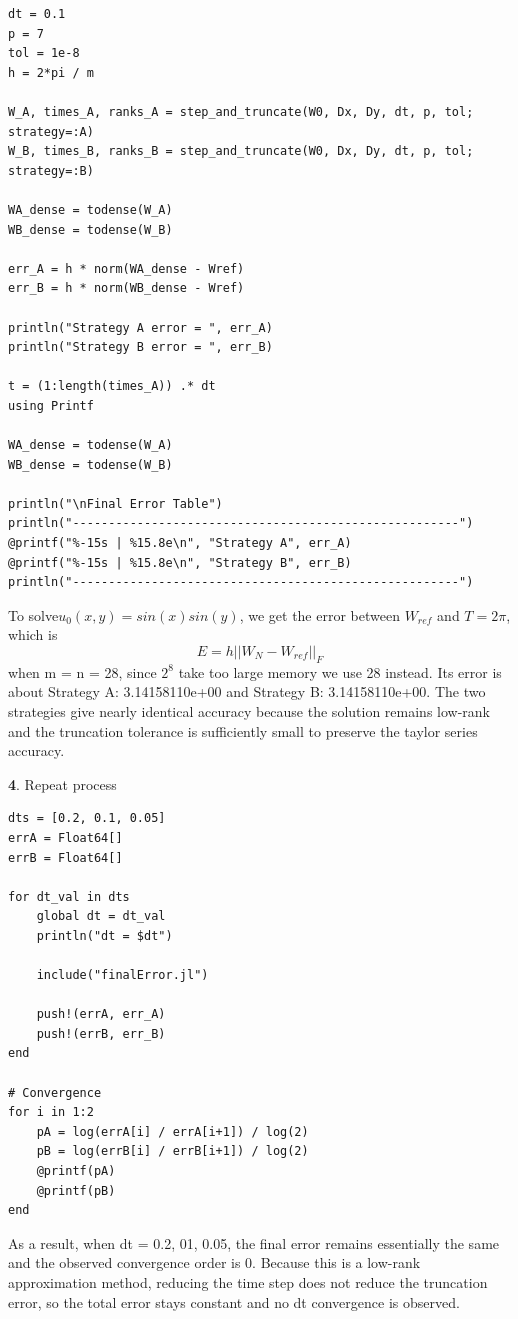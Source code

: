 \documentclass[11pt]{article}
\begin{document}
\begin{lstlisting}
dt = 0.1
p = 7
tol = 1e-8
h = 2*pi / m

W_A, times_A, ranks_A = step_and_truncate(W0, Dx, Dy, dt, p, tol; strategy=:A)
W_B, times_B, ranks_B = step_and_truncate(W0, Dx, Dy, dt, p, tol; strategy=:B)

WA_dense = todense(W_A)
WB_dense = todense(W_B)

err_A = h * norm(WA_dense - Wref)
err_B = h * norm(WB_dense - Wref)

println("Strategy A error = ", err_A)
println("Strategy B error = ", err_B)

t = (1:length(times_A)) .* dt
using Printf

WA_dense = todense(W_A)
WB_dense = todense(W_B)

println("\nFinal Error Table")
println("------------------------------------------------------")
@printf("%-15s | %15.8e\n", "Strategy A", err_A)
@printf("%-15s | %15.8e\n", "Strategy B", err_B)
println("------------------------------------------------------")

\end{lstlisting}

To solve$ u_0(x,y) = sin(x)sin(y)$, we get the error between $W_{ref}$ and $T = 2\pi$, which is
\[
E = h||W_N - W_{ref}||_F 
\]
when m = n = 28, since $2^8$ take too large memory we use 28 instead. Its error is about Strategy A:  3.14158110e+00 and Strategy B:  3.14158110e+00. The two strategies give nearly identical accuracy because the solution remains low-rank and the truncation tolerance is sufficiently small to preserve the taylor series accuracy.

\vspace{1.5em}

\textbf{4}. Repeat process

\begin{lstlisting}
dts = [0.2, 0.1, 0.05]
errA = Float64[]
errB = Float64[]

for dt_val in dts
    global dt = dt_val
    println("dt = $dt")

    include("finalError.jl")

    push!(errA, err_A)
    push!(errB, err_B)
end

# Convergence
for i in 1:2
    pA = log(errA[i] / errA[i+1]) / log(2)
    pB = log(errB[i] / errB[i+1]) / log(2)
    @printf(pA)
    @printf(pB)
end
\end{lstlisting}

As a result, when dt = 0.2, 01, 0.05, the final error remains essentially the same and the observed convergence order is 0. Because this is a low-rank approximation method, reducing the time step does not reduce the truncation error, so the total error stays constant and no dt convergence is observed.
\end{document}
